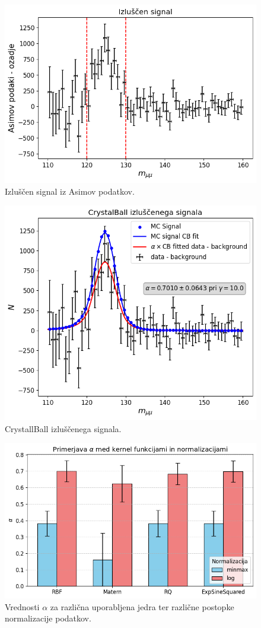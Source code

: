 \documentclass[slovene,11pt,a4paper]{article}
\begin{document}
\begin{figure}[h!]
    \centering
    \includegraphics[width=0.8\linewidth]{imgs/IzluscenSignalAsimovData_GPR.png}
    \caption{Izluščen signal iz Asimov podatkov.}
    \label{fig:IzluscenSignalAsimovData_GPR}
\end{figure}

\begin{figure}[h!]
    \centering
    \includegraphics[width=0.8\linewidth]{imgs/CrystallBall_izluscenega_signala.png}
    \caption{CrystallBall izluščenega signala.}
    \label{fig:CrystallBall_izluscenega_signala}
\end{figure}

\begin{figure}[h!]
    \centering
    \includegraphics[width=0.8\linewidth]{imgs/alphas.png}
    \caption{Vrednosti $\alpha$ za različna uporabljena jedra ter različne postopke normalizacije podatkov.}
    \label{fig:alphas}
\end{figure}
\end{document}
